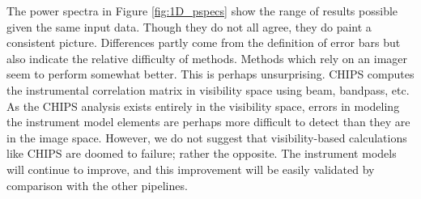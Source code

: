 \documentclass[twolcolumn,iop]{emulateapj}
\begin{document}
The power spectra in Figure \ref{fig:1D_pspecs} show the range of results possible given the same input data. Though they do not all agree, they do paint a consistent picture.  Differences partly come from the definition of error bars but also indicate the relative difficulty of methods. Methods which rely on an imager seem to perform somewhat better. This is perhaps unsurprising. CHIPS computes the instrumental correlation matrix in visibility space using beam, bandpass, etc. As the CHIPS analysis exists entirely in the visibility space, errors in modeling the instrument model elements are perhaps more difficult to detect than they are in the image space.  However, we do not suggest that visibility-based calculations like CHIPS are doomed to failure; rather the opposite. The instrument models will continue to improve, and this improvement will be easily validated by comparison with the other pipelines.
\end{document}
